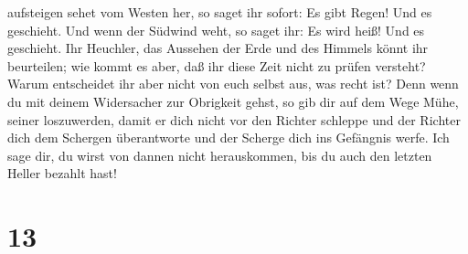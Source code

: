 aufsteigen sehet vom Westen her, so saget ihr sofort: Es gibt Regen! Und
es geschieht.  Und wenn der Südwind weht, so saget ihr:
Es wird heiß! Und es geschieht.  Ihr Heuchler, das
Aussehen der Erde und des Himmels könnt ihr beurteilen; wie kommt es
aber, daß ihr diese Zeit nicht zu prüfen versteht?  Warum
entscheidet ihr aber nicht von euch selbst aus, was recht ist?
 Denn wenn du mit deinem Widersacher zur Obrigkeit gehst,
so gib dir auf dem Wege Mühe, seiner loszuwerden, damit er dich nicht
vor den Richter schleppe und der Richter dich dem Schergen überantworte
und der Scherge dich ins Gefängnis werfe.  Ich sage dir,
du wirst von dannen nicht herauskommen, bis du auch den letzten Heller
bezahlt hast!

\hypertarget{section-12}{%
\section{13}\label{section-12}}

